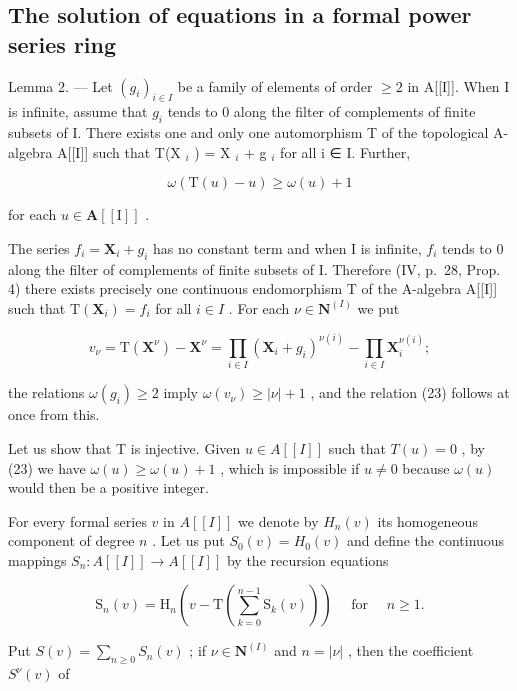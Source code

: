 \subsection{The solution of equations in a formal power series ring}

Lemma 2. --- Let \((g_i)_{i \in I}\) be a family of elements of order \(\geqslant 2\) in A{[}{[}I{]}{]}. When I is infinite, assume that \(g_i\) tends to 0 along the filter of complements of finite subsets of I. There exists one and only one automorphism T of the topological A-algebra A{[}{[}I{]}{]} such that T(X \(_i\) ) = X \(_i\) + g \(_i\) for all i ∈ I. Further,

\[
\omega (\mathrm{T} (u) - u) \geqslant \omega (u) + 1\tag{23}
\]

for each \(u \in \mathbf{A}[[\mathrm{I}]]\) .

The series \(f_{i} = \mathbf{X}_{i} + g_{i}\) has no constant term and when I is infinite, \(f_{i}\) tends to 0 along the filter of complements of finite subsets of I. Therefore (IV, p.~28, Prop. 4) there exists precisely one continuous endomorphism T of the A-algebra A{[}{[}I{]}{]} such that \(\mathrm{T}(\mathbf{X}_i) = f_i\) for all \(i \in I\) . For each \(\nu \in \mathbf{N}^{(I)}\) we put

\[
v _ {\nu} = \mathrm{T} \left(\mathbf {X} ^ {\nu}\right) - \mathbf {X} ^ {\nu} = \prod_ {i \in I} \left(\mathbf {X} _ {i} + g _ {i}\right) ^ {\nu (i)} - \prod_ {i \in I} \mathbf {X} _ {i} ^ {\nu (i)};
\]

the relations \(\omega(g_i) \geqslant 2\) imply \(\omega(v_\nu) \geqslant |\nu| + 1\) , and the relation (23) follows at once from this.

Let us show that T is injective. Given \(u \in A[[I]]\) such that \(T(u) = 0\) , by (23) we have \(\omega(u) \geqslant \omega(u) + 1\) , which is impossible if \(u \neq 0\) because \(\omega(u)\) would then be a positive integer.

For every formal series \(v\) in \(A[[I]]\) we denote by \(H_n(v)\) its homogeneous component of degree \(n\) . Let us put \(S_0(v) = H_0(v)\) and define the continuous mappings \(S_n: A[[I]] \to A[[I]]\) by the recursion equations

\[
\mathrm{S} _ {n} (v) = \mathrm{H} _ {n} \left(v - \mathrm{T} \left(\sum_ {k = 0} ^ {n - 1} \mathrm{S} _ {k} (v)\right)\right) \quad \text { for } \quad n \geqslant 1.\tag{24}
\]

Put \(S(v) = \sum_{n \geqslant 0} S_n(v)\) ; if \(\nu \in \mathbf{N}^{(I)}\) and \(n = |\nu|\) , then the coefficient \(S^{\nu}(v)\) of

